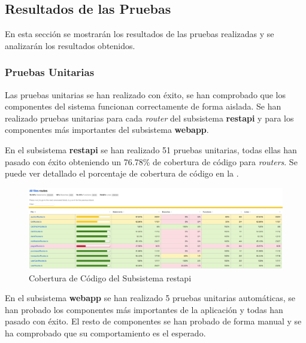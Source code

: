 \subsection{Resultados de las Pruebas}
En esta sección se mostrarán los resultados de las pruebas realizadas y se analizarán los resultados obtenidos.

\subsubsection{Pruebas Unitarias}
Las pruebas unitarias se han realizado con éxito, se han comprobado que los componentes del sistema funcionan correctamente de forma aislada.
Se han realizado pruebas unitarias para cada \textit{router} del subsistema \textbf{restapi} y para los componentes más importantes del subsistema \textbf{webapp}. 

En el subsistema \textbf{restapi} se han realizado 51 pruebas unitarias, todas ellas han pasado con éxito obteniendo un 76.78\% de cobertura de código para \textit{routers}.
Se puede ver detallado el porcentaje de cobertura de código en la .
\begin{figure}[H]
    \hypertarget{fig:6_8_Cobertura-Code-Restapi}{}
    \centering
    \includegraphics[width=0.8\linewidth]{figures/6-Analisis/6-Pruebas/6_8-Coverage-Restapi.png}
    \caption{Cobertura de Código del Subsistema restapi}
    \label{fig:6_8_Cobertura-Code-Restapi}
\end{figure}

En el subsistema \textbf{webapp} se han realizado 5 pruebas unitarias automáticas, se han probado los componentes más importantes de la aplicación y todas han pasado con éxito.
El resto de componentes se han probado de forma manual y se ha comprobado que su comportamiento es el esperado.


